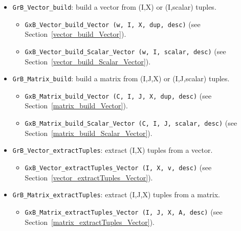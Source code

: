 \begin{itemize}

\item \verb'GrB_Vector_build': build a vector from (I,X) or (I,scalar) tuples.

    \begin{itemize}
    \item \verb'GxB_Vector_build_Vector (w, I, X, dup, desc)' \newline
    (see Section~\ref{vector_build_Vector}).
    \item \verb'GxB_Vector_build_Scalar_Vector (w, I, scalar, desc)' \newline
    (see Section~\ref{vector_build_Scalar_Vector}).
    \end{itemize}

\item \verb'GrB_Matrix_build': build a matrix from (I,J,X) or (I,J,scalar) tuples.

    \begin{itemize}
    \item \verb'GxB_Matrix_build_Vector (C, I, J, X, dup, desc)' \newline
    (see Section~\ref{matrix_build_Vector}).
    \item \verb'GxB_Matrix_build_Scalar_Vector (C, I, J, scalar, desc)' \newline
    (see Section~\ref{matrix_build_Scalar_Vector}).
    \end{itemize}

\item \verb'GrB_Vector_extractTuples': extract (I,X) tuples from a vector.

    \begin{itemize}
    \item \verb'GxB_Vector_extractTuples_Vector (I, X, v, desc)' \newline
    (see Section~\ref{vector_extractTuples_Vector}).
    \end{itemize}

\item \verb'GrB_Matrix_extractTuples': extract (I,J,X) tuples from a matrix.

    \begin{itemize}
    \item \verb'GxB_Matrix_extractTuples_Vector (I, J, X, A, desc)' \newline
    (see Section~\ref{matrix_extractTuples_Vector}).
    \end{itemize}


\end{itemize}
